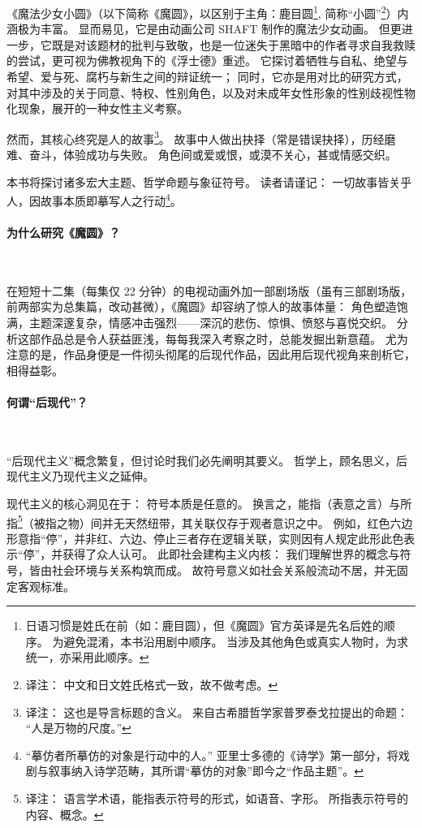 《魔法少女小圆》（以下简称《魔圆》，以区别于主角：鹿目圆\footnote{%
    日语习惯是姓氏在前（如：鹿目圆），但《魔圆》官方英译是先名后姓的顺序。
    为避免混淆，本书沿用剧中顺序。
    当涉及其他角色或真实人物时，为求统一，亦采用此顺序。
}, 简称“小圆”\footnote{%
    译注：
    中文和日文姓氏格式一致，故不做考虑。
}）内涵极为丰富。
显而易见，它是由动画公司 SHAFT 制作的魔法少女动画。
但更进一步，它既是对该题材的批判与致敬，也是一位迷失于黑暗中的作者寻求自我救赎的尝试，更可视为佛教视角下的《浮士德》重述。
它探讨着牺牲与自私、绝望与希望、爱与死、腐朽与新生之间的辩证统一；
同时，它亦是用对比的研究方式，对其中涉及的关于同意、特权、性别角色，以及对未成年女性形象的性别歧视性物化现象，展开的一种女性主义考察。

然而，其核心终究是人的故事\footnote{%
    译注：
    这也是导言标题的含义。
    来自古希腊哲学家普罗泰戈拉提出的命题：
    “人是万物的尺度。”
}。
故事中人做出抉择（常是错误抉择），历经磨难、奋斗，体验成功与失败。
角色间或爱或恨，或漠不关心，甚或情感交织。

本书将探讨诸多宏大主题、哲学命题与象征符号。
读者请谨记：
一切故事皆关乎人，因故事本质即摹写人之行动\footnote{%
    “摹仿者所摹仿的对象是行动中的人。”
    亚里士多德的《诗学》第一部分，将戏剧与叙事纳入诗学范畴，其所谓“摹仿的对象”即今之“作品主题”。
}\cite{ref1}。
\paragraph{为什么研究《魔圆》？}~{}

在短短十二集（每集仅 22 分钟）的电视动画外加一部剧场版（虽有三部剧场版，前两部实为总集篇，改动甚微），《魔圆》却容纳了惊人的故事体量：
角色塑造饱满，主题深邃复杂，情感冲击强烈——深沉的悲伤、惊惧、愤怒与喜悦交织。
分析这部作品总是令人获益匪浅，每每我深入考察之时，总能发掘出新意蕴。
尤为注意的是，作品身便是一件彻头彻尾的后现代作品，因此用后现代视角来剖析它，相得益彰。
\paragraph{何谓“后现代”？}~{}

“后现代主义”概念繁复，但讨论时我们必先阐明其要义。
哲学上，顾名思义，后现代主义乃现代主义之延伸。

现代主义的核心洞见在于：
符号本质是任意的。
换言之，能指（表意之言）与所指\footnote{%
    译注：
    语言学术语，能指表示符号的形式，如语音、字形。
    所指表示符号的内容、概念。
}（被指之物）间并无天然纽带，其关联仅存于观者意识之中。
例如，红色六边形意指“停”，并非红、六边、停止三者存在逻辑关联，实则因有人规定此形此色表示“停”，并获得了众人认可。
此即社会建构主义内核：
我们理解世界的概念与符号，皆由社会环境与关系构筑而成。
故符号意义如社会关系般流动不居，并无固定客观标准\cite{ref2}。

